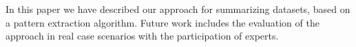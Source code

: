 In this paper we have described our approach for summarizing datasets, based on a pattern extraction algorithm. Future work includes the evaluation of the approach in real case scenarios with the participation of experts.
